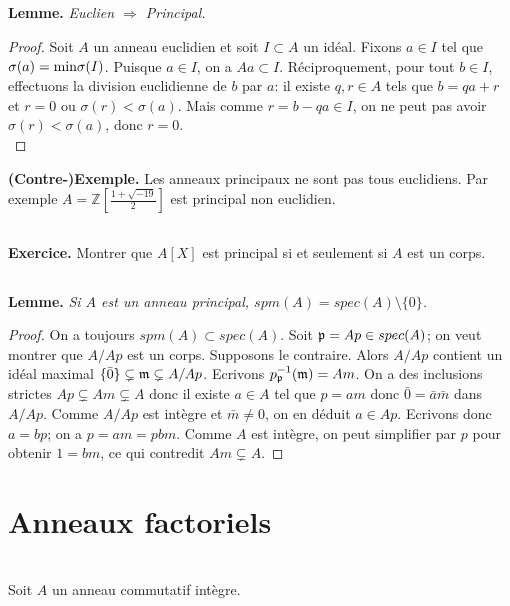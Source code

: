 \documentclass[a4paper, 12pt]{amsart}
\newcommand{\Z}{\mathbb{Z}}
\begin{document}
 

\subsection{ }\hspace{-0.cm}\label{EuclIsPrinc}\textbf{Lemme.} \textit{Euclien $\Rightarrow$ Principal.} 
 
 \begin{proof} Soit $A$ un anneau euclidien et soit $I\subset A$ un id\'eal. Fixons $a\in I$ tel que $\sigma(a)=\hbox{\rm min}\sigma(I)$. Puisque $a\in I$, on a $Aa\subset I$. R\'eciproquement, pour tout $b\in I$, effectuons la division euclidienne de $b$ par $a$: il existe $q,r\in A$ tels que $b=qa+r$ et $r=0$ ou $\sigma(r)<\sigma(a)$. Mais comme $r=b-qa\in I$, on ne peut pas avoir $\sigma(r)<\sigma(a)$, donc $r=0$.\\
 \end{proof}
 
 \noindent\textbf{(Contre-)Exemple.} Les anneaux principaux ne sont pas tous euclidiens. Par exemple  $A=\Z[\frac{1+\sqrt{-19}}{2}]$ est principal non euclidien.\\
 
 \subsection{}\textbf{Exercice.} Montrer que $A[X]$ est principal si et seulement si $A$ est un corps. 
  \subsection{}\textbf{Lemme.} \textit{Si $A$ est un anneau principal, $spm(A)=spec(A)\setminus \lbrace 0\rbrace$.}
  
  \begin{proof} On a toujours $spm(A)\subset spec(A)$. Soit $\frak{p}=Ap\in spec(A)$; on veut montrer que $A/Ap$ est un corps. Supposons le contraire. Alors $A/Ap$ contient un id\'eal maximal $\lbrace \bar{0}\rbrace\subsetneq\frak{m}\subsetneq A/Ap$. Ecrivons $p_{\frak{p}}^{-1}(\frak{m})=Am$. On a des inclusions strictes  $Ap\subsetneq Am\subsetneq A$ donc il existe $a\in A$ tel que $p=am$ donc $\bar{0}=\bar{a}\bar{m}$ dans $A/Ap$. Comme $A/Ap$ est int\`egre et $\bar{m}\not= 0$, on en d\'eduit $a\in Ap$. Ecrivons donc $a=bp$; on a $p=am=pbm$. Comme $A$ est int\`egre, on peut simplifier par $p$ pour obtenir $1=bm$, ce qui contredit $ Am\subsetneq A$.   \end{proof}
 \section{Anneaux factoriels}\label{Factoriel} \textit{}\\
 \noindent Soit $A$ un anneau commutatif int\`egre. \\
 
\end{document}
